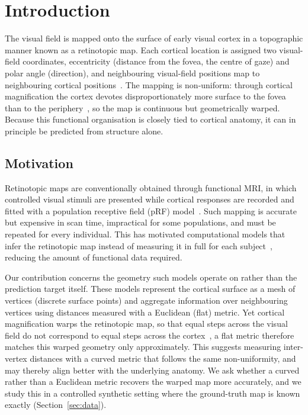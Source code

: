 \section{Introduction}
\label{sec:intro}

The visual field is mapped onto the surface of early visual cortex in a
topographic manner known as a retinotopic map. Each cortical location is assigned
two visual-field coordinates, eccentricity (distance from the fovea, the centre
of gaze) and polar angle (direction), and neighbouring visual-field positions map to neighbouring
cortical positions~\cite{wandell2007,sereno1995borders}. The mapping is
non-uniform: through cortical magnification the cortex devotes disproportionately
more surface to the fovea than to the periphery~\cite{cowey1974,schwartz1980}, so
the map is continuous but geometrically warped. Because this functional
organisation is closely tied to cortical anatomy, it can in principle be predicted
from structure alone.

\subsection{Motivation}
\label{sec:motivation}

Retinotopic maps are conventionally obtained through functional MRI, in which
controlled visual stimuli are presented while cortical responses are recorded and
fitted with a population receptive field (pRF) model~\cite{dumoulin2008}. Such
mapping is accurate but expensive in scan time, impractical for some populations,
and must be repeated for every individual. This has motivated computational models
that infer the retinotopic map instead of measuring it in full for each
subject~\cite{ribeiro2021}, reducing the amount of functional data required.

Our contribution concerns the geometry such models operate on rather than the
prediction target itself. These models represent the cortical surface as a mesh of
vertices (discrete surface points) and aggregate information over neighbouring
vertices using distances measured with a Euclidean (flat) metric. Yet cortical
magnification warps the retinotopic map, so that equal steps across the visual
field do not correspond to equal steps across the cortex~\cite{cowey1974,schwartz1980},
a flat metric therefore matches this warped geometry only approximately. This
suggests measuring inter-vertex distances with a curved metric that follows the
same non-uniformity, and may thereby align better with the underlying anatomy. We
ask whether a curved rather than a Euclidean metric recovers the warped map more
accurately, and we study this in a controlled synthetic setting where the
ground-truth map is known exactly (Section~\ref{sec:data}).

